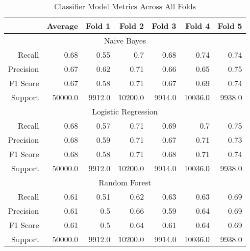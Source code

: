 \begin{table}[h]
    \centering
    \begin{tabular}{r|r|r|r|r|r|r}
        & Average & Fold 1 & Fold 2 & Fold 3 & Fold 4 & Fold 5 \\\hline
        \multicolumn{7}{c}{Naive Bayes} \\\hline
        Recall      & 0.68 & 0.55 & 0.7 & 0.68 & 0.74 & 0.74 \\
        Precision   & 0.67 & 0.62 & 0.71 & 0.66 & 0.65 & 0.75 \\
        F1 Score    & 0.67 & 0.58 & 0.71 & 0.67 & 0.69 & 0.74 \\
        Support     & 50000.0 & 9912.0 & 10200.0 & 9914.0 & 10036.0 & 9938.0 \\\hline
        \multicolumn{7}{c}{Logistic Regression} \\\hline
        Recall      & 0.68 & 0.57 & 0.71 & 0.69 & 0.7 & 0.75 \\
        Precision   & 0.68 & 0.59 & 0.71 & 0.67 & 0.71 & 0.73 \\
        F1 Score    & 0.68 & 0.58 & 0.71 & 0.68 & 0.71 & 0.74 \\
        Support     & 50000.0 & 9912.0 & 10200.0 & 9914.0 & 10036.0 & 9938.0 \\\hline
        \multicolumn{7}{c}{Random Forest} \\\hline
        Recall      & 0.61 & 0.51 & 0.62 & 0.63 & 0.63 & 0.69 \\
        Precision   & 0.61 & 0.5 & 0.66 & 0.59 & 0.64 & 0.69 \\
        F1 Score    & 0.61 & 0.5 & 0.64 & 0.61 & 0.64 & 0.69 \\
        Support     & 50000.0 & 9912.0 & 10200.0 & 9914.0 & 10036.0 & 9938.0 \\\hline
    \end{tabular}
    \caption{Classifier Model Metrics Across All Folds}
    \label{tab:combined_fold_metrics}
\end{table}
